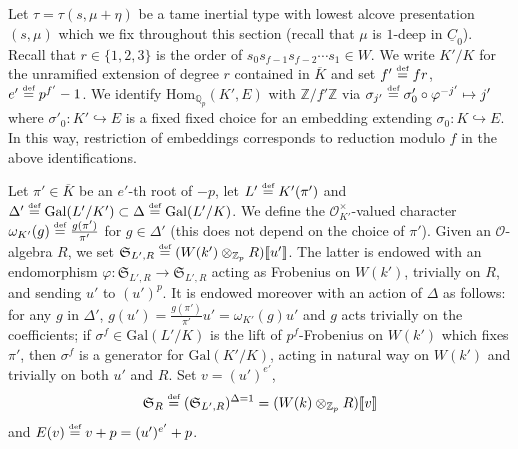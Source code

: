 \documentclass[oneside,a4paper,english, 11pt]{amsart}
\theoremstyle{plain}
\theoremstyle{plain}
\theoremstyle{plain}
\theoremstyle{plain}
\theoremstyle{plain}
\theoremstyle{plain}
\theoremstyle{definition}
\theoremstyle{definition}
\theoremstyle{definition}
\theoremstyle{remark}
\numberwithin{equation}{section}
\newcommand{\Z}{\mathbb{Z}}
\newcommand{\Qp}{\mathbb{Q}_p}
\newcommand{\fS}{\mathfrak{S}}
\newcommand{\cO}{\mathcal{O}}
\newcommand{\phz}{\varphi}
\newcommand{\Zp}{\mathbb{Z}_p}
\newcommand{\Gal}{\mathrm{Gal}}
\newcommand{\Hom}{\mathrm{Hom}}
\newcommand{\un}[1]{\underline{#1}}
\newcommand{\defeq}{\stackrel{\textrm{\tiny{def}}}{=}}
\newcommand{\ovl}[1]{\overline{#1}}
\newcommand{\ra}{\rightarrow}
\newcommand{\iarrow}{\hookrightarrow}
\begin{document}
Let $\tau=\tau(s,\mu+\eta)$ be a tame inertial type with lowest alcove presentation $(s, \mu)$ which we fix throughout this section (recall that $\mu$ is $1$-deep in $\un{C}_0$).
Recall that $r\in\{1,2,3\}$ is the order of $s_0 s_{f-1} s_{f-2} \cdots s_1 \in W$.
We write $K'/K$ for the unramified extension of degree $r$ contained in $\ovl{K}$ and set  $f'\defeq fr$, $e' \defeq p^{f'}-1$.
We identify $\Hom_{\Qp}(K',E)$ with $\Z/f' \Z$ via $\sigma_{j'} \defeq \sigma'_0\circ \phz^{-j'} \mapsto j'$ where $\sigma'_0:K' \iarrow E$ is a fixed fixed choice for an embedding extending $\sigma_0:K \iarrow E$. %
In this way, restriction of embeddings corresponds to reduction modulo $f$ in the above identifications.
%
%
%

Let $\pi'\in \ovl{K}$ be an $e'$-th root of $-p$, let $L' \defeq K'(\pi')$ and $\Delta' \defeq \Gal(L'/K') \subset \Delta \defeq \Gal(L'/K)$. 
We define the $\cO_{K'}^{\times}$-valued character $\omega_{K'}(g) \defeq  \frac{g(\pi')}{\pi'}$ for $g \in \Delta'$ (this does not depend on the choice of $\pi'$).
Given an $\cO$-algebra $R$, we set $\fS_{L', R} \defeq (W(k') \otimes_{\Zp} R)[\![u']\!]$. 
The latter is endowed with an endomorphism $\varphi:\fS_{L', R} \ra \fS_{L', R}$ acting as Frobenius on $W(k')$, trivially on $R$, and sending $u'$ to $(u')^{p}$.  
It is endowed moreover with an action of $\Delta$ as follows: for any $g$ in $\Delta'$, $g(u') = \frac{g(\pi')}{\pi'} u' = \omega_{K'}(g) u'$   
%
and $g$ acts trivially on the coefficients; if $\sigma^f \in\Gal(L'/K)$ is the lift of $p^f$-Frobenius on $W(k')$ which fixes $\pi'$, then $\sigma^f$ is a generator for $\Gal(K'/K)$, acting in natural way on $W(k')$ and trivially on both $u'$ and $R$. 
Set $v = (u')^{e'}$, 
\[
\fS_R \defeq (\fS_{L', R})^{\Delta = 1} = (W(k) \otimes_{\Zp} R)[\![v]\!]
\]
and $E(v) \defeq v + p = (u')^{e'} + p$.  
\end{document}
